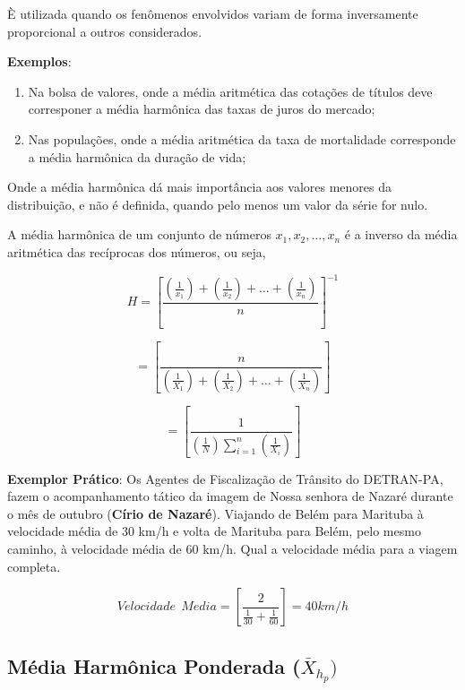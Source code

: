 È utilizada quando os fenômenos envolvidos variam de forma inversamente proporcional a outros considerados.\vskip0.3cm

\textbf{Exemplos}:
\begin{enumerate}
  \item Na bolsa de valores, onde a média aritmética das cotações de títulos deve corresponer a média harmônica das taxas de juros do mercado;
  \item Nas populações, onde a média aritmética da taxa de mortalidade corresponde a média harmônica da duração de vida;
\end{enumerate}

Onde a média harmônica dá mais importância aos valores menores da distribuição, e não é definida, quando pelo menos um valor da série for nulo.\vskip0.3cm


A média harmônica de um conjunto de números $x_{1},x_{2},\ldots,x_{n}$ é a inverso da média
aritmética das recíprocas dos números, ou seja,


\begin{equation}\label{harmonica1}
H= \left[ \frac{  (\frac{1}{x_{1}})+(\frac{1}{x_{2}})+\ldots+(\frac{1}{x_{n}})  }{n} \right ]  ^{-1} 
\end{equation}

\begin{equation*}\label{harmonica1}
 =\left[  \frac{n}{(\frac{1}{X_{1}})+(\frac{1}{X_{2}})+\ldots+(\frac{1}{X_{n}})}  \right ]
\end{equation*}

\begin{equation*}\label{harmonica}
=\left[  \frac{1}{ (\frac{1}{N}) \sum_{i=1}^{n} (\frac{1}{X_{i}}) } \right ]
\end{equation*}
\vskip0.3cm

\textbf{Exemplor Prático}: Os Agentes de Fiscalização de Trânsito do DETRAN-PA, fazem o acompanhamento tático da imagem de Nossa senhora de Nazaré durante o mês de outubro (\textbf{Círio de Nazaré}). Viajando de Belém para Marituba à velocidade média de 30 km/h e volta de Marituba para Belém, pelo mesmo caminho, à velocidade média de 60 km/h. Qual a velocidade média para a viagem completa.

\begin{equation}\label{exemplo_harmonica}
Velocidade \ \  Media = \left[\frac{2}{\frac{1}{30}+\frac{1}{60}} \right ]= 40 km/h
\end{equation}

\newpage
\subsection{Média Harmônica Ponderada ($\bar{X}_{h_{p}})$}


